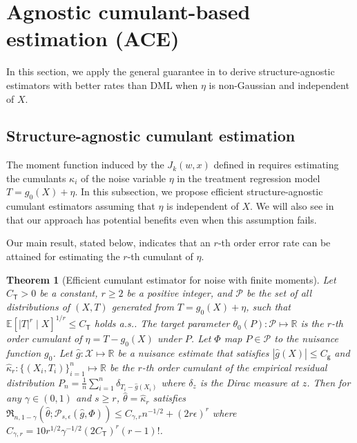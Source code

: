 \documentclass{article}
\def\eps{{\epsilon}}
\def\gP{{\mathcal{P}}}
\def\gX{{\mathcal{X}}}
\newcommand{\E}{\mathbb{E}}
\newcommand{\R}{\mathbb{R}}
\newtheorem{theorem}{Theorem}[section]
\begin{document}
%

%
%
%
%
%
%
%
%
%
%
%
%
%
%
%
%
%
%

%

%

%
%
%
%
%
%
%
%

%



%

\section{Agnostic cumulant-based estimation (ACE)}
\label{sec:independent-noise-causal}

%

In this section, we apply the general guarantee in  to derive structure-agnostic estimators with better rates than DML when $\eta$ is non-Gaussian and independent of $X$.

%

\subsection{Structure-agnostic cumulant estimation}%
\label{sec:residual}

%
%

The moment function induced by the $J_k(w,x)$ defined in  requires estimating the cumulants $\kappa_i$ of the noise variable $\eta$ in the treatment regression model $T=g_0(X)+\eta$. In this subsection, we propose efficient structure-agnostic cumulant estimators assuming that $\eta$ is independent of $X$. We will also see in  that our approach has potential benefits even when this assumption fails. 

%
%


%

Our main result, stated below, indicates that an $r$-th order error rate can be attained for estimating the $r$-th cumulant of $\eta$.

\begin{theorem}[Efficient cumulant estimator for noise with finite moments]
    \label{thm:estimating-cumulants-finite-moment}
    Let $C_{\mathsf{T}}>0$ be a constant, $r \geq 2$ be a positive integer, and $\gP$ be the set of all distributions of $(X,T)$ generated from $T=g_0(X)+\eta$, such that $\E[|T|^r\mid X]^{1/r} \leq C_{\mathsf{T}}$ holds a.s.. The target parameter $\theta_0(P):\gP\mapsto\R$ is the $r$-th order cumulant of $\eta=T-g_0(X)$ under $P$. Let $\Phi$ map $P\in\gP$ to the nuisance function $g_0$. Let $\hat{g}:\gX\mapsto\R$ be a nuisance estimate that satisfies $|\hat{g}(X)|\leq C_{\mathsf{g}}$ and $\hat{\kappa}_r: \{(X_i,T_i)\}_{i=1}^n\mapsto\R$ be the $r$-th order cumulant of the empirical residual distribution $P_n=\frac{1}{n}\sum_{i=1}^n\delta_{T_i-\hat{g}(X_i)}$ where $\delta_z$ is the Dirac measure at $z$. Then for any $\gamma \in (0,1)$ and $s \geq r$, $\hat\theta=\hat{\kappa}_r$ satisfies $\mathfrak{R}_{n,1-\gamma}\left(\hat\theta; \gP_{s,\eps}(\hat{g},\Phi)\right) \leq C_{\gamma,r} n^{-1/2} + (2r\eps)^r$ where $C_{\gamma,r}=10 r^{1/2}\gamma^{-1/2}(2C_{\mathsf{T}})^r(r-1)!$.
\end{theorem}
\end{document}
